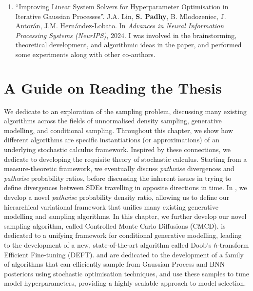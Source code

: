 \begin{enumerate}
    \item ``Improving Linear System Solvers for Hyperparameter Optimisation in Iterative Gaussian Processes''. J.A. Lin, \textbf{S. Padhy}, B. Mlodozeniec, J. Antorán, J.M. Hernández-Lobato. In \textit{Advances in Neural Information Processing Systems (NeurIPS)}, 2024. I was involved in the brainstorming, theoretical development, and algorithmic ideas in the paper, and performed some experiments along with other co-authors.
\end{enumerate}

\section{A Guide on Reading the Thesis}

We dedicate  to an exploration of the sampling problem, discussing many existing algorithms across the fields of unnormalised density sampling, generative modelling, and conditional sampling. Throughout this chapter, we show how different algorithms are specific instantiations (or approximations) of an underlying stochastic calculus framework. Inspired by these connections, we dedicate  to developing the requisite theory of stochastic calculus. Starting from a measure-theoretic framework, we eventually discuss \emph{pathwise} divergences and \emph{pathwise} probability ratios, before discussing the inherent issues in trying to define divergences between SDEs travelling in opposite directions in time. In , we develop a novel \emph{pathwise} probability density ratio, allowing us to define our hierarchical variational framework that unifies many existing generative modelling and sampling algorithms. In this chapter, we further develop our novel sampling algorithm, called Controlled Monte Carlo Diffusions (CMCD).  is dedicated to a unifying framework for conditional generative modelling, leading to the development of a new, state-of-the-art algorithm called Doob's $h$-transform Efficient Fine-tuning (DEFT).  and  are dedicated to the development of a family of algorithms that can efficiently sample from Gaussian Process and BNN posteriors using stochastic optimisation techniques, and use these samples to tune model hyperparameters, providing a highly scalable approach to model selection.

